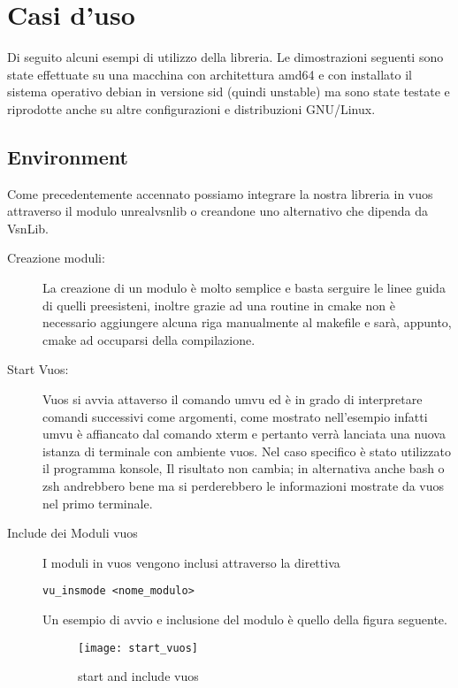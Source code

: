 

\chapter{Casi d'uso}                %
\lhead[\fancyplain{}{\bfseries\thepage}]{\fancyplain{}{\bfseries\rightmark}}
Di seguito alcuni esempi di utilizzo della libreria.
Le dimostrazioni seguenti sono state effettuate su una macchina con architettura amd64 e con installato il sistema operativo debian in versione sid (quindi unstable) ma sono state testate e riprodotte anche su altre configurazioni e distribuzioni GNU/Linux.
\section{Environment}
Come precedentemente accennato possiamo integrare la nostra libreria in vuos attraverso il modulo unrealvsnlib o creandone uno alternativo che dipenda da VsnLib.\\
\begin{description}
\item[Creazione moduli:] La creazione di un modulo \`e molto semplice e basta serguire le linee guida di quelli preesisteni, inoltre grazie ad una routine in cmake non \`e necessario aggiungere alcuna riga manualmente al makefile e sar\`a, appunto, cmake ad occuparsi della compilazione.
\item[Start Vuos:] Vuos si avvia attaverso il comando umvu ed \`e in grado di interpretare comandi successivi come argomenti, come mostrato nell'esempio infatti umvu \`e affiancato dal comando xterm e pertanto verr\`a lanciata una nuova istanza di terminale con ambiente vuos. Nel caso specifico \`e stato utilizzato il programma konsole, Il risultato non cambia; in alternativa anche bash o zsh andrebbero bene ma si perderebbero le informazioni mostrate da vuos nel primo terminale.
\item[Include dei Moduli vuos] I moduli in vuos vengono inclusi attraverso la direttiva
\begin{verbatim}
vu_insmode <nome_modulo>
\end{verbatim}
Un esempio di avvio e inclusione del modulo \`e quello della figura seguente.
\begin{figure}[h]                       %
\begin{center}                          %
\texttt{[image: start\_vuos]}%
%
\caption[start/include\_mod vuos]{start and include vuos}\label{fig:start_vuos}
\end{center}
\end{figure}
\end{description}
